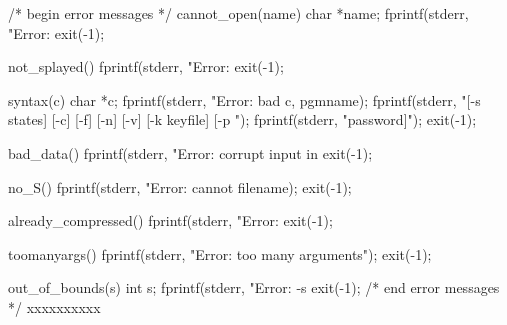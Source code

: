 /* begin error messages */
cannot_open(name)
char *name;
{
	fprintf(stderr, "Error: %
	exit(-1);
}

not_splayed()
{
	fprintf(stderr, "Error: %
	exit(-1);
}

syntax(c)
char *c;
{
	fprintf(stderr, "Error: bad %
		c, pgmname);
	fprintf(stderr, "[-s states] [-c] [-f] [-n] [-v] [-k keyfile] [-p ");
	fprintf(stderr, "password]\n");
	exit(-1);
}

bad_data()
{
	fprintf(stderr, "Error: corrupt input in %
	exit(-1);
}

no_S()
{
	fprintf(stderr, "Error: cannot %
		filename);
	exit(-1);
}

already_compressed()
{
	fprintf(stderr, "Error: %
	exit(-1);
}

toomanyargs()
{
	fprintf(stderr, "Error: too many arguments\n");
	exit(-1);
}

out_of_bounds(s)
int s;
{
	fprintf(stderr, "Error: -s %
	exit(-1);
}
/* end error messages */
xxxxxxxxxx
